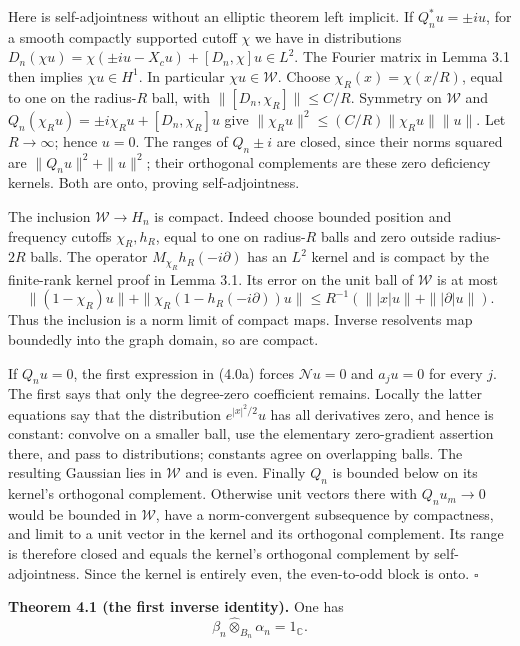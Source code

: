 \documentclass[
  11pt,
]{article}
\begin{document}
Here is self-adjointness without an elliptic theorem left implicit. If
\(Q_n^*u=\pm iu\), for a smooth compactly supported cutoff \(\chi\) we
have in distributions
\(D_n(\chi u)=\chi(\pm iu-X_cu)+[D_n,\chi]u\in L^2\). The Fourier matrix
in Lemma 3.1 then implies \(\chi u\in H^1\). In particular
\(\chi u\in\mathcal W\). Choose \(\chi_R(x)=\chi(x/R)\), equal to one on
the radius-\(R\) ball, with \(\|[D_n,\chi_R]\|\leq C/R\). Symmetry on
\(\mathcal W\) and \(Q_n(\chi_Ru)=\pm i\chi_Ru+[D_n,\chi_R]u\) give
\(\|\chi_Ru\|^2\leq(C/R)\|\chi_Ru\|\|u\|\). Let \(R\to\infty\); hence
\(u=0\). The ranges of \(Q_n\pm i\) are closed, since their norms
squared are \(\|Q_nu\|^2+\|u\|^2\); their orthogonal complements are
these zero deficiency kernels. Both are onto, proving self-adjointness.

The inclusion \(\mathcal W\to H_n\) is compact. Indeed choose bounded
position and frequency cutoffs \(\chi_R,h_R\), equal to one on
radius-\(R\) balls and zero outside radius-\(2R\) balls. The operator
\(M_{\chi_R}h_R(-i\partial)\) has an \(L^2\) kernel and is compact by
the finite-rank kernel proof in Lemma 3.1. Its error on the unit ball of
\(\mathcal W\) is at most \[
\|(1-\chi_R)u\|+\|\chi_R(1-h_R(-i\partial))u\|
\leq R^{-1}(\||x|u\|+\||\partial|u\|).
\tag{4.0b}
\] Thus the inclusion is a norm limit of compact maps. Inverse
resolvents map boundedly into the graph domain, so are compact.

If \(Q_nu=0\), the first expression in (4.0a) forces \(\mathcal Nu=0\)
and \(a_ju=0\) for every \(j\). The first says that only the degree-zero
coefficient remains. Locally the latter equations say that the
distribution \(e^{|x|^2/2}u\) has all derivatives zero, and hence is
constant: convolve on a smaller ball, use the elementary zero-gradient
assertion there, and pass to distributions; constants agree on
overlapping balls. The resulting Gaussian lies in \(\mathcal W\) and is
even. Finally \(Q_n\) is bounded below on its kernel's orthogonal
complement. Otherwise unit vectors there with \(Q_nu_m\to0\) would be
bounded in \(\mathcal W\), have a norm-convergent subsequence by
compactness, and limit to a unit vector in the kernel and its orthogonal
complement. Its range is therefore closed and equals the kernel's
orthogonal complement by self-adjointness. Since the kernel is entirely
even, the even-to-odd block is onto. \(\square\)

\textbf{Theorem 4.1 (the first inverse identity).} One has \[
\beta_n\widehat\otimes_{B_n}\alpha_n=1_{\mathbb C}.
\tag{4.3}
\]
\end{document}
